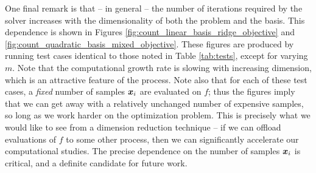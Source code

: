 \documentclass[]{aiaa-tc}%
\begin{document}
\newpage
One final remark is that -- in general -- the number of iterations required by the solver increases with the dimensionality of both the problem and the basis. This dependence is shown in Figures \ref{fig:count_linear_basis_ridge_objective} and \ref{fig:count_quadratic_basis_mixed_objective}. These figures are produced by running test cases identical to those noted in Table \ref{tab:tests}, except for varying $m$. Note that the computational growth rate is slowing with increasing dimension, which is an attractive feature of the process. Note also that for each of these test cases, a \emph{fixed} number of samples $\boldsymbol{x}_i$ are evaluated on $f$; thus the figures imply that we can get away with a relatively unchanged number of expensive samples, so long as we work harder on the optimization problem. This is precisely what we would like to see from a dimension reduction technique -- if we can offload evaluations of $f$ to some other process, then we can significantly accelerate our computational studies. The precise dependence on the number of samples $\boldsymbol{x}_i$ is critical, and a definite candidate for future work.
\end{document}
